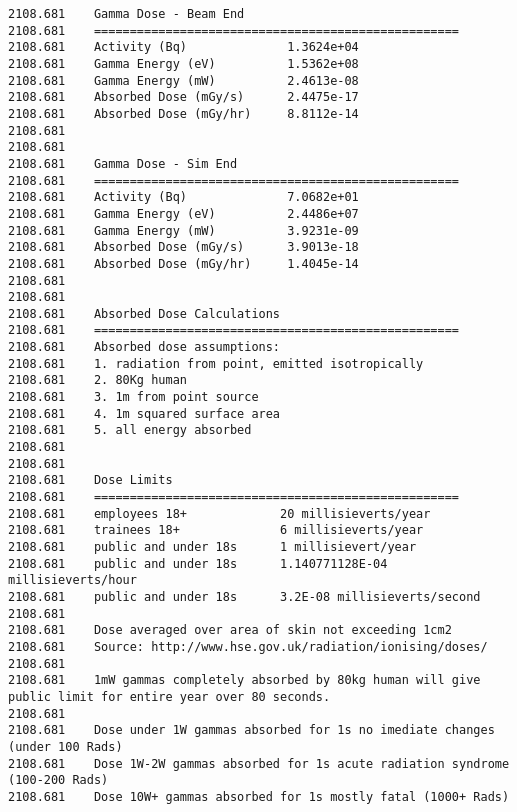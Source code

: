 \begin{lstlisting}[style=sOutputFile,caption={Final results for steel irradiation},label={listing:alexsteel}]
2108.681    Gamma Dose - Beam End  
2108.681    ===================================================
2108.681    Activity (Bq)              1.3624e+04  
2108.681    Gamma Energy (eV)          1.5362e+08    
2108.681    Gamma Energy (mW)          2.4613e-08   
2108.681    Absorbed Dose (mGy/s)      2.4475e-17    
2108.681    Absorbed Dose (mGy/hr)     8.8112e-14                
2108.681    
2108.681    
2108.681    Gamma Dose - Sim End
2108.681    ===================================================
2108.681    Activity (Bq)              7.0682e+01
2108.681    Gamma Energy (eV)          2.4486e+07    
2108.681    Gamma Energy (mW)          3.9231e-09     
2108.681    Absorbed Dose (mGy/s)      3.9013e-18     
2108.681    Absorbed Dose (mGy/hr)     1.4045e-14   
2108.681    
2108.681    
2108.681    Absorbed Dose Calculations
2108.681    ===================================================
2108.681    Absorbed dose assumptions:
2108.681    1. radiation from point, emitted isotropically
2108.681    2. 80Kg human
2108.681    3. 1m from point source
2108.681    4. 1m squared surface area
2108.681    5. all energy absorbed
2108.681    
2108.681    
2108.681    Dose Limits
2108.681    ===================================================
2108.681    employees 18+             20 millisieverts/year
2108.681    trainees 18+              6 millisieverts/year
2108.681    public and under 18s      1 millisievert/year
2108.681    public and under 18s      1.140771128E-04 millisieverts/hour
2108.681    public and under 18s      3.2E-08 millisieverts/second
2108.681    
2108.681    Dose averaged over area of skin not exceeding 1cm2
2108.681    Source: http://www.hse.gov.uk/radiation/ionising/doses/
2108.681    
2108.681    1mW gammas completely absorbed by 80kg human will give public limit for entire year over 80 seconds.
2108.681    
2108.681    Dose under 1W gammas absorbed for 1s no imediate changes (under 100 Rads)
2108.681    Dose 1W-2W gammas absorbed for 1s acute radiation syndrome (100-200 Rads)
2108.681    Dose 10W+ gammas absorbed for 1s mostly fatal (1000+ Rads)
\end{lstlisting}


